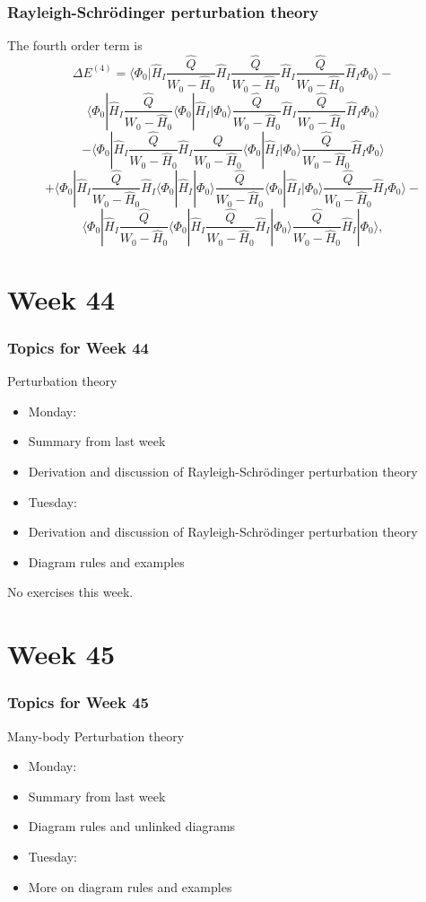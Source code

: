 \documentclass[compress]{beamer}
\begin{document}
\frame
{
\frametitle{Rayleigh-Schr\"odinger perturbation theory}
\begin{small}
{\scriptsize
The fourth order term is
\[
\Delta E^{(4)}=\langle \Phi_0|\hat{H}_I\frac{\hat{Q}}{W_0-\hat{H}_0}\hat{H}_I\frac{\hat{Q}}{W_0-\hat{H}_0}\hat{H}_I\frac{\hat{Q}}{W_0-\hat{H}_0}\hat{H}_I\Phi_0\rangle-\]
\[
\langle \Phi_0|\hat{H}_I\frac{\hat{Q}}{W_0-\hat{H}_0}\langle \Phi_0|\hat{H}_I|\Phi_0\rangle\frac{\hat{Q}}{W_0-\hat{H}_0}\hat{H}_I\frac{\hat{Q}}{W_0-\hat{H}_0}\hat{H}_I\Phi_0\rangle
\]
\[
-\langle \Phi_0|\hat{H}_I\frac{\hat{Q}}{W_0-\hat{H}_0}\hat{H}_I\frac{\hat{Q}}{W_0-\hat{H}_0}\langle \Phi_0|\hat{H}_I|\Phi_0\rangle\frac{\hat{Q}}{W_0-\hat{H}_0}\hat{H}_I\Phi_0\rangle\]
\[
+\langle \Phi_0|\hat{H}_I\frac{\hat{Q}}{W_0-\hat{H}_0}\hat{H}_I\langle \Phi_0|\hat{H}_I|\Phi_0\rangle\frac{\hat{Q}}{W_0-\hat{H}_0}\langle \Phi_0|\hat{H}_I|\Phi_0\rangle\frac{\hat{Q}}{W_0-\hat{H}_0}\hat{H}_I\Phi_0\rangle
-\]
\[
\langle\Phi_0|\hat{H}_I\frac{\hat{Q}}{W_0-\hat{H}_0}\langle\Phi_0|\hat{H}_I\frac{\hat{Q}}{W_0-\hat{H}_0}\hat{H}_I|\Phi_0\rangle  \frac{\hat{Q}}{W_0-\hat{H}_0}\hat{H}_I|\Phi_0\rangle,
\]
}
\end{small}
}




\section{Week  44}
\frame
{
  \frametitle{Topics for Week 44}
  \begin{block}{Perturbation theory}
\begin{itemize}
\item Monday:
\item Summary from last week
\item Derivation and discussion of Rayleigh-Schr\"odinger perturbation theory
\item Tuesday:
\item Derivation and discussion of Rayleigh-Schr\"odinger perturbation theory
\item Diagram rules and examples
\end{itemize}
No exercises this week.
  \end{block}
} 

\section{Week 45}

\frame
{
  \frametitle{Topics for Week 45}
  \begin{block}{Many-body Perturbation theory}
\begin{itemize}
\item Monday:
\item Summary from last week
\item Diagram rules and unlinked diagrams
\item Tuesday:
\item More on diagram rules and examples
\end{itemize}
  \end{block}
} 
\end{document}
